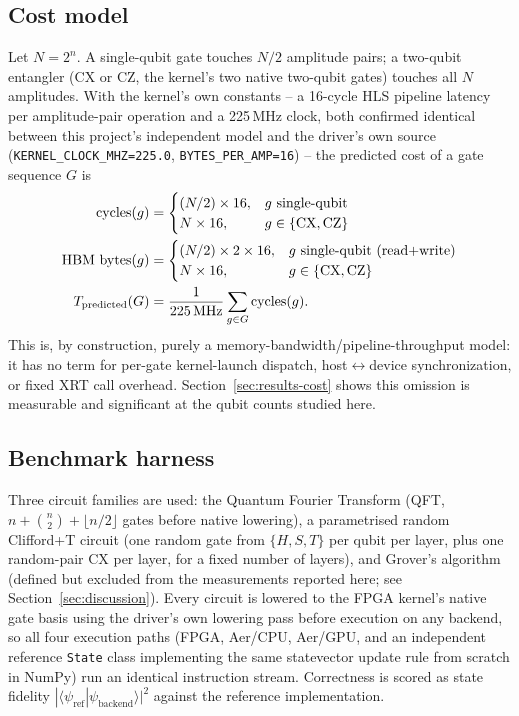 \documentclass[pdflatex,sn-mathphys,Numbered]{sn-jnl}
\begin{document}
\subsection{Cost model}\label{sec:model}

Let $N=2^{n}$. A single-qubit gate touches $N/2$ amplitude pairs; a two-qubit entangler (CX or CZ, the kernel's two native two-qubit gates) touches all $N$ amplitudes. With the kernel's own constants -- a 16-cycle HLS pipeline latency per amplitude-pair operation and a 225\,MHz clock, both confirmed identical between this project's independent model and the driver's own source (\texttt{KERNEL\_CLOCK\_MHZ=225.0}, \texttt{BYTES\_PER\_AMP=16}) -- the predicted cost of a gate sequence $G$ is
\begin{align}
\text{cycles}(g) &=
\begin{cases}
(N/2)\times 16, & g \text{ single-qubit} \\
N\times 16, & g \in \{\text{CX},\text{CZ}\}
\end{cases} \\
\text{HBM bytes}(g) &=
\begin{cases}
(N/2)\times 2\times 16, & g \text{ single-qubit (read+write)} \\
N\times 16, & g \in \{\text{CX},\text{CZ}\}
\end{cases} \\
T_{\text{predicted}}(G) &= \frac{1}{225\text{\,MHz}}\sum_{g\in G}\text{cycles}(g).
\end{align}
This is, by construction, purely a memory-bandwidth/pipeline-throughput model: it has no term for per-gate kernel-launch dispatch, host$\leftrightarrow$device synchronization, or fixed XRT call overhead. Section~\ref{sec:results-cost} shows this omission is measurable and significant at the qubit counts studied here.

\subsection{Benchmark harness}

Three circuit families are used: the Quantum Fourier Transform (QFT, $n+\binom{n}{2}+\lfloor n/2\rfloor$ gates before native lowering), a parametrised random Clifford+T circuit (one random gate from $\{H,S,T\}$ per qubit per layer, plus one random-pair CX per layer, for a fixed number of layers), and Grover's algorithm (defined but excluded from the measurements reported here; see Section~\ref{sec:discussion}). Every circuit is lowered to the FPGA kernel's native gate basis using the driver's own lowering pass before execution on any backend, so all four execution paths (FPGA, Aer/CPU, Aer/GPU, and an independent reference \texttt{State} class implementing the same statevector update rule from scratch in NumPy) run an identical instruction stream. Correctness is scored as state fidelity $|\langle\psi_{\text{ref}}|\psi_{\text{backend}}\rangle|^{2}$ against the reference implementation.
\end{document}
